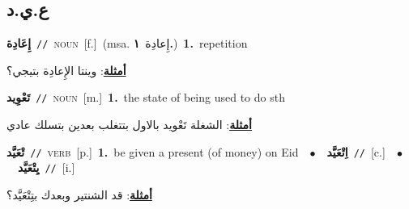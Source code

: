 \documentclass[10pt,a4paper,twoside]{article} %
\begin{document}
\begin{multicols}{2}
\vspace{-3mm}
\subsection*{\color{blue}\foreignlanguage{arabic}{ع.ي.د}\color{blue}{}} 

{\setlength\topsep{0pt}\textbf{\foreignlanguage{arabic}{إِعَادِة}}\ {\color{gray}\texttt{//}\color{black}}\ \textsc{noun}\ [f.]\ \color{gray}(msa. \foreignlanguage{arabic}{إِعادِة}~\foreignlanguage{arabic}{\textbf{١.}})\color{black}\ \textbf{1.}~repetition\  \begin{flushright}\color{gray}\foreignlanguage{arabic}{\textbf{\underline{\foreignlanguage{arabic}{أمثلة}}}: وينتا الإِعادِة بتيجي؟}\end{flushright}\color{black}} \vspace{2mm}

{\setlength\topsep{0pt}\textbf{\foreignlanguage{arabic}{تَعْوِيد}}\ {\color{gray}\texttt{//}\color{black}}\ \textsc{noun}\ [m.]\ \textbf{1.}~the state of being used to do sth\  \begin{flushright}\color{gray}\foreignlanguage{arabic}{\textbf{\underline{\foreignlanguage{arabic}{أمثلة}}}: الشغلة تَعْويد بالاول بتتغلب بعدين بتسلك عادي}\end{flushright}\color{black}} \vspace{2mm}

{\setlength\topsep{0pt}\textbf{\foreignlanguage{arabic}{تْعَيَّد}}\ {\color{gray}\texttt{//}\color{black}}\ \textsc{verb}\ [p.]\ \textbf{1.}~be given a present (of money) on Eid\ \ $\bullet$\ \ \setlength\topsep{0pt}\textbf{\foreignlanguage{arabic}{اِتْعَيَّد}}\ {\color{gray}\texttt{//}\color{black}}\ [c.]\ \ $\bullet$\ \ \setlength\topsep{0pt}\textbf{\foreignlanguage{arabic}{يِتْعَيَّد}}\ {\color{gray}\texttt{//}\color{black}}\ [i.]\  \begin{flushright}\color{gray}\foreignlanguage{arabic}{\textbf{\underline{\foreignlanguage{arabic}{أمثلة}}}: قد الشنتير وبعدك بتِتْعَيَّد؟}\end{flushright}\color{black}} \vspace{2mm}


\end{multicols}
\end{document}
